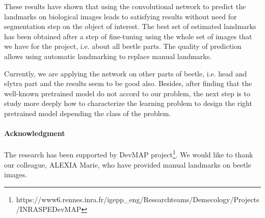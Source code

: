 \documentclass{article} %
\begin{document}
\begin{multicols}{2}
These results have shown that using the convolutional network to predict the
landmarks on biological images leads to satisfying results without need for segmentation step on the object of interest. The
best set of estimated landmarks has been obtained after a step
of fine-tuning using the whole set of images that we have for the
project, i.e. about all beetle parts. The quality of prediction allows using automatic landmarking to replace manual landmarks. 

Currently, we are applying the network on other parts of beetle, i.e. head and elytra part and the results seem to be good also. Besides, after finding that the well-known pretrained model do not accord to our problem, the next step is to study more deeply how to characterize the learning problem to design the right pretrained model depending the class of the problem.

\paragraph{Acknowledgment}

The research has been supported by DevMAP project\footnote{https://www6.rennes.inra.fr/igepp\_eng/Research\-teams/Demecology/Projects/INRA\-SPE\-DevMAP}. We would like to thank our colleague, ALEXIA Marie, who have provided manual landmarks on beetle images.

\footnotesize{




} 

\end{multicols}
\end{document}
